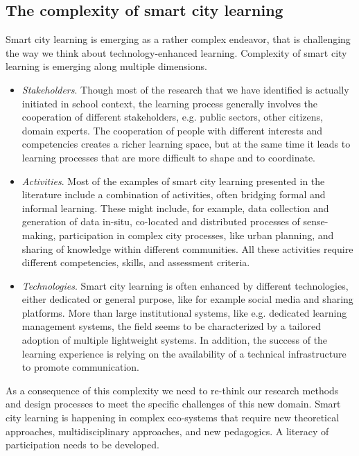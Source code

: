 \subsection*{The complexity of smart city learning}
Smart city learning is emerging as a rather complex endeavor, that is challenging the way we think about technology-enhanced learning. Complexity of smart city learning is emerging along multiple dimensions.
\begin{itemize}
\item \textit{Stakeholders}. Though most of the research that we have identified is actually initiated in school context, the learning process generally involves the cooperation of different stakeholders, e.g. public sectors, other citizens, domain experts. The cooperation of people with different interests and competencies creates a richer learning space, but at the same time it leads to learning processes that are more difficult to shape and to coordinate.
\item \textit{Activities}. Most of the examples of smart city learning presented in the literature include a combination of activities, often bridging formal and informal learning. These might include, for example, data collection and generation of data in-situ, co-located and distributed processes of sense-making, participation in complex city processes, like urban planning, and sharing of knowledge within different communities. All these activities require different competencies, skills, and assessment criteria.
\item \textit{Technologies}. Smart city learning is often enhanced by different technologies, either dedicated or general purpose, like for example social media and sharing platforms. More than large institutional systems, like e.g. dedicated learning management systems, the field seems to be characterized by a tailored adoption of multiple lightweight systems. In addition, the success of the learning experience is relying on the availability of a technical infrastructure to promote communication.
\end{itemize}

As a consequence of this complexity we need to re-think our research methods and design processes to meet the specific challenges of this new domain. Smart city learning is happening in complex eco-systems that require new theoretical approaches, multidisciplinary approaches, and new pedagogics. A literacy of participation needs to be developed.


